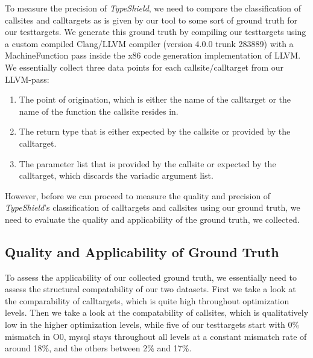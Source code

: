 To measure the precision of \textit{TypeShield}, we need to compare the classification of callsites and calltargets as is given by our tool to some sort of ground truth for our testtargets. We generate this ground truth by compiling our testtargets using a custom compiled Clang/LLVM compiler (version 4.0.0 trunk 283889) with a MachineFunction pass inside the x86 code generation implementation of LLVM. We essentially collect three data points for each callsite/calltarget from our LLVM-pass:
\begin{enumerate}
\item The point of origination, which is either the name of the calltarget or the name of the function the callsite resides in.
\item The return type that is either expected by the callsite or provided by the calltarget.
\item The parameter list that is provided by the callsite or expected by the calltarget, which discards the variadic argument list.
\end{enumerate}
However, before we can proceed to measure the quality and precision of \textit{TypeShield}'s classification of calltargets and callsites using our ground truth, we need to evaluate the quality and applicability of the ground truth, we collected.

\subsection{Quality and Applicability of Ground Truth}
\label{subsection:typeshieldprecision}
To assess the applicability of our collected ground truth, we essentially need to assess the structural compatability of our two datasets. First we take a look at the comparability of calltargets, which is quite high throughout optimization levels. Then we take a look at the compatability of callsites, which is qualitatively low in the higher optimization levels, while five of our testtargets start with 0\% mismatch in O0, mysql stays throughout all levels at a constant mismatch rate of around 18\%, and the others between 2\% and 17\%.

